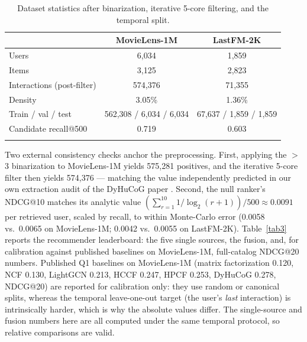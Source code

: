 \documentclass[pdflatex,sn-mathphys-num]{sn-jnl}
\theoremstyle{thmstyleone}%
\theoremstyle{thmstyletwo}%
\theoremstyle{thmstylethree}%
\begin{document}
\begin{table}[h]
\caption{Dataset statistics after binarization, iterative 5-core filtering, and the temporal split.}
\label{tab2}
\begin{tabular*}{\textwidth}{@{\extracolsep\fill}lcc}
\toprule
 & MovieLens-1M & LastFM-2K \\
\midrule
Users & 6,034 & 1,859 \\
Items & 3,125 & 2,823 \\
Interactions (post-filter) & 574,376 & 71,355 \\
Density & 3.05\% & 1.36\% \\
Train / val / test & 562,308 / 6,034 / 6,034 & 67,637 / 1,859 / 1,859 \\
Candidate recall@500 & 0.719 & 0.603 \\
\botrule
\end{tabular*}
\end{table}

Two external consistency checks anchor the preprocessing. First, applying the $>$3 binarization to MovieLens-1M yields 575{,}281 positives, and the iterative 5-core filter then yields 574{,}376 --- matching the value independently predicted in our own extraction audit of the DyHuCoG paper \cite{dyhucogspec}. Second, the null ranker's NDCG@10 matches its analytic value $(\sum_{r=1}^{10}1/\log_2(r+1))/500 \approx 0.0091$ per retrieved user, scaled by recall, to within Monte-Carlo error (0.0058 vs.\ 0.0065 on MovieLens-1M; 0.0042 vs.\ 0.0055 on LastFM-2K). Table~\ref{tab3} reports the recommender leaderboard: the five single sources, the fusion, and, for calibration against published baselines on MovieLens-1M, full-catalog NDCG@20 numbers. Published Q1 baselines on MovieLens-1M (matrix factorization 0.120, NCF 0.130, LightGCN 0.213, HCCF 0.247, HPCF 0.253, DyHuCoG 0.278, NDCG@20) \cite{louhichi2026} are reported for calibration only: they use random or canonical splits, whereas the temporal leave-one-out target (the user's \emph{last} interaction) is intrinsically harder, which is why the absolute values differ. The single-source and fusion numbers here are all computed under the same temporal protocol, so relative comparisons are valid.
\end{document}
